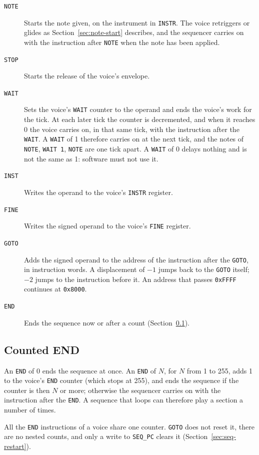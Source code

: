 \begin{description}
	\item[\texttt{NOTE}] Starts the note given, on the instrument in \texttt{INSTR}. The voice retriggers or glides as
	      Section~\ref{sec:note-start} describes, and the sequencer carries on with the instruction after \texttt{NOTE}
	      when the note has been applied.
	\item[\texttt{STOP}] Starts the release of the voice's envelope.
	\item[\texttt{WAIT}] Sets the voice's \texttt{WAIT} counter to the operand and ends the voice's work for the tick. At
	      each later tick the counter is decremented, and when it reaches 0 the voice carries on, in that same tick, with
	      the instruction after the \texttt{WAIT}. A \texttt{WAIT} of 1 therefore carries on at the next tick, and the notes of
	      \texttt{NOTE}, \texttt{WAIT 1}, \texttt{NOTE} are one tick apart. A \texttt{WAIT} of 0 delays nothing and is not
	      the same as 1: software must not use it.
	\item[\texttt{INST}] Writes the operand to the voice's \texttt{INSTR} register.
	\item[\texttt{FINE}] Writes the signed operand to the voice's \texttt{FINE} register.
	\item[\texttt{GOTO}] Adds the signed operand to the address of the instruction after the \texttt{GOTO}, in instruction
	      words. A displacement of $-1$ jumps back to the \texttt{GOTO} itself; $-2$ jumps to the instruction before it. An address that passes \texttt{0xFFFF} continues at \texttt{0x8000}.
	\item[\texttt{END}] Ends the sequence now or after a count (Section~\ref{sec:seq-end}).
\end{description}

\subsection{Counted END}
\label{sec:seq-end}

An \texttt{END} of 0 ends the sequence at once. An \texttt{END} of $N$, for $N$ from 1 to 255, adds 1 to the voice's
\texttt{END} counter (which stops at 255), and ends the sequence if the counter is then $N$ or more; otherwise the
sequencer carries on with the instruction after the \texttt{END}. A sequence that loops can therefore play a section a
number of times.

All the \texttt{END} instructions of a voice share one counter. \texttt{GOTO} does not reset it, there are no nested
counts, and only a write to \texttt{SEQ\_PC} clears it (Section~\ref{sec:seq-restart}).

